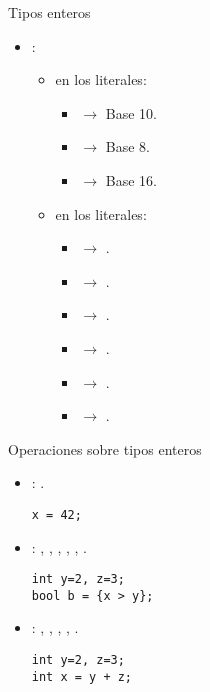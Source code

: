 \begin{frame}[t]{Tipos enteros}
\begin{itemize}
  \item {}:
    \begin{itemize}

      \item {} en los literales:
        \begin{itemize}
          \item {} $\rightarrow$ Base 10.
          \item {} $\rightarrow$ Base 8.
          \item {} $\rightarrow$ Base 16.
        \end{itemize}

      \item {} en los literales:
        \begin{itemize}
          \item {} $\rightarrow$ .
          \item {} $\rightarrow$ .
          \item {} $\rightarrow$ .
          \item {} $\rightarrow$ .
          \item {} $\rightarrow$ .
          \item {} $\rightarrow$ .
        \end{itemize}
    \end{itemize}
\end{itemize}
\end{frame}

\begin{frame}[fragile,t]{Operaciones sobre tipos enteros}
\begin{itemize}
      \item {}: \cppkey{=}.
\begin{lstlisting}
x = 42;
\end{lstlisting}

      \item {}:
        \cppkey{==},
        \cppkey{!=},
        \cppkey{<},
        \cppkey{<=},
        \cppkey{>},
        \cppkey{>=}.

\begin{lstlisting}
int y=2, z=3;
bool b = {x > y};
\end{lstlisting}

      \item {}: 
        \cppkey{+}, \cppkey{-}, \cppkey{*}, \cppkey{/}, \cppkey{\%}.
\begin{lstlisting}
int y=2, z=3;
int x = y + z;
\end{lstlisting}
\end{itemize}
\end{frame}

